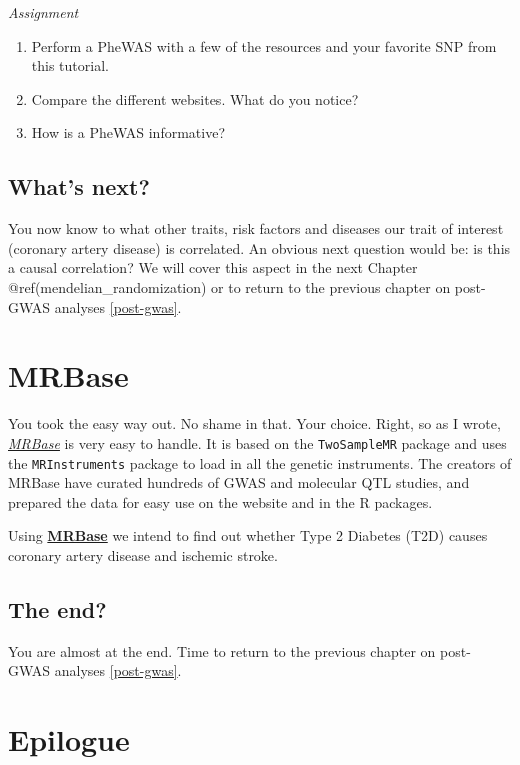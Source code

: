\documentclass[
]{book}
\providecommand{\tightlist}{%
  \setlength{\itemsep}{0pt}\setlength{\parskip}{0pt}}
\begin{document}
\emph{Assignment}

\begin{enumerate}
\def\labelenumi{\arabic{enumi}.}
\tightlist
\item
  Perform a PheWAS with a few of the resources and your favorite SNP from this tutorial.
\item
  Compare the different websites. What do you notice?
\item
  How is a PheWAS informative?
\end{enumerate}

\hypertarget{whats-next}{%
\section{What's next?}\label{whats-next}}

You now know to what other traits, risk factors and diseases our trait of interest (coronary artery disease) is correlated. An obvious next question would be: is this a causal correlation? We will cover this aspect in the next Chapter @ref(mendelian\_randomization) or to return to the previous chapter on post-GWAS analyses \ref{post-gwas}.

\hypertarget{mr_mrbase}{%
\chapter{MRBase}\label{mr_mrbase}}

You took the easy way out. No shame in that. Your choice. Right, so as I wrote, \emph{\href{http://www.mrbase.org/}{MRBase}} is very easy to handle. It is based on the \texttt{TwoSampleMR} package and uses the \texttt{MRInstruments} package to load in all the genetic instruments. The creators of MRBase have curated hundreds of GWAS and molecular QTL studies, and prepared the data for easy use on the website and in the R packages.

Using \textbf{\href{http://www.mrbase.org/}{MRBase}} we intend to find out whether Type 2 Diabetes (T2D) causes coronary artery disease and ischemic stroke.

\hypertarget{the-end}{%
\section{The end?}\label{the-end}}

You are almost at the end. Time to return to the previous chapter on post-GWAS analyses \ref{post-gwas}.

\hypertarget{epilogue}{%
\chapter{Epilogue}\label{epilogue}}
\end{document}
